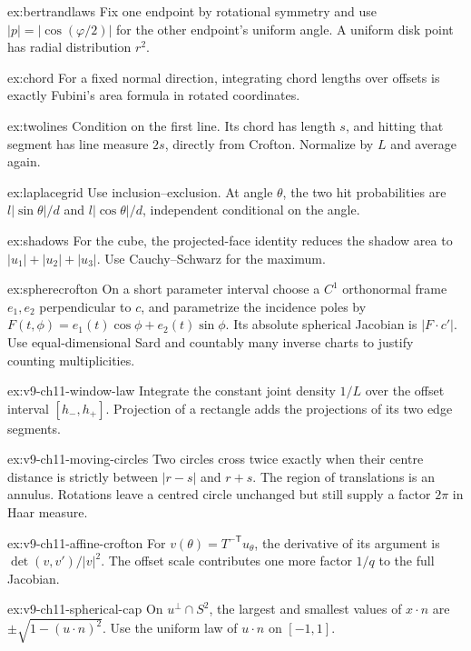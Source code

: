 \begin{hint}{ex:bertrandlaws}
Fix one endpoint by rotational symmetry and use $|p|=|\cos(\varphi/2)|$ for the other endpoint's uniform angle. A uniform disk point has radial distribution $r^2$.
\end{hint}
\begin{hint}{ex:chord}
For a fixed normal direction, integrating chord lengths over offsets is exactly Fubini's area formula in rotated coordinates.
\end{hint}
\begin{hint}{ex:twolines}
Condition on the first line. Its chord has length $s$, and hitting that segment has line measure $2s$, directly from Crofton. Normalize by $L$ and average again.
\end{hint}
\begin{hint}{ex:laplacegrid}
Use inclusion--exclusion. At angle $\theta$, the two hit probabilities are $l|\sin\theta|/d$ and $l|\cos\theta|/d$, independent conditional on the angle.
\end{hint}
\begin{hint}{ex:shadows}
For the cube, the projected-face identity reduces the shadow area to $|u_1|+|u_2|+|u_3|$. Use Cauchy--Schwarz for the maximum.
\end{hint}
\begin{hint}{ex:spherecrofton}
On a short parameter interval choose a $C^1$ orthonormal frame $e_1,e_2$ perpendicular to $c$, and parametrize the incidence poles by $F(t,\phi)=e_1(t)\cos\phi+e_2(t)\sin\phi$. Its absolute spherical Jacobian is $|F\cdot c'|$. Use equal-dimensional Sard and countably many inverse charts to justify counting multiplicities.
\end{hint}
\begin{hint}{ex:v9-ch11-window-law}
Integrate the constant joint density $1/L$ over the offset interval $[h_-,h_+]$. Projection of a rectangle adds the projections of its two edge segments.
\end{hint}
\begin{hint}{ex:v9-ch11-moving-circles}
Two circles cross twice exactly when their centre distance is strictly between $|r-s|$ and $r+s$. The region of translations is an annulus. Rotations leave a centred circle unchanged but still supply a factor $2\pi$ in Haar measure.
\end{hint}
\begin{hint}{ex:v9-ch11-affine-crofton}
For $v(\theta)=T^{-\mathsf T}u_\theta$, the derivative of its argument is $\det(v,v')/|v|^2$. The offset scale contributes one more factor $1/q$ to the full Jacobian.
\end{hint}
\begin{hint}{ex:v9-ch11-spherical-cap}
On $u^\perp\cap S^2$, the largest and smallest values of $x\cdot n$ are $\pm\sqrt{1-(u\cdot n)^2}$. Use the uniform law of $u\cdot n$ on $[-1,1]$.
\end{hint}

